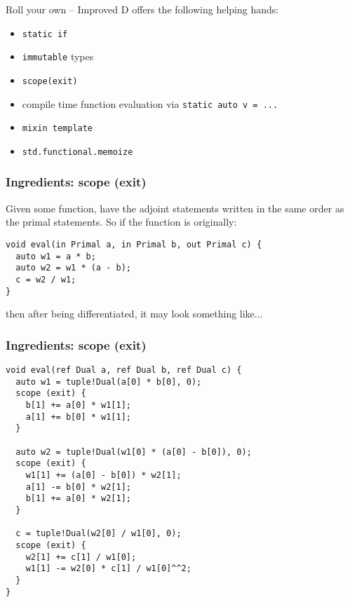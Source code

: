 \documentclass[xcolor=dvipsnames]{beamer}
\begin{document}
\begin{frame}{Roll your own -- Improved}
 D offers the following helping hands:
\vspace{5mm}
\begin{itemize}
\item \texttt{static if} \vspace{5mm}
\item \texttt{immutable} types \vspace{5mm}
\item \texttt{scope(exit)} \vspace{5mm}
\item compile time function evaluation via \texttt{static auto v = ...} \vspace{5mm}
\item \texttt{mixin template} \vspace{5mm}
\item \texttt{std.functional.memoize}
\end{itemize}
\end{frame}


\begin{frame}[fragile]
  \frametitle{Ingredients: scope (exit)}
Given some function, have the adjoint statements written in the same order as the primal statements. So if the function is originally:
\vspace{2mm}
  \begin{lstlisting}
void eval(in Primal a, in Primal b, out Primal c) {
  auto w1 = a * b;
  auto w2 = w1 * (a - b);
  c = w2 / w1;
}
  \end{lstlisting}
\vspace{2mm}
then after being differentiated, it may look something like...
\end{frame}


\begin{frame}[fragile]
  \frametitle{Ingredients: scope (exit)}
  \begin{lstlisting}
void eval(ref Dual a, ref Dual b, ref Dual c) {
  auto w1 = tuple!Dual(a[0] * b[0], 0);
  scope (exit) {
    b[1] += a[0] * w1[1];
    a[1] += b[0] * w1[1];
  }

  auto w2 = tuple!Dual(w1[0] * (a[0] - b[0]), 0);
  scope (exit) {
    w1[1] += (a[0] - b[0]) * w2[1];
    a[1] -= b[0] * w2[1];
    b[1] += a[0] * w2[1];
  }

  c = tuple!Dual(w2[0] / w1[0], 0);
  scope (exit) {
    w2[1] += c[1] / w1[0];
    w1[1] -= w2[0] * c[1] / w1[0]^^2;
  }
}
  \end{lstlisting}
\end{frame}
\end{document}
